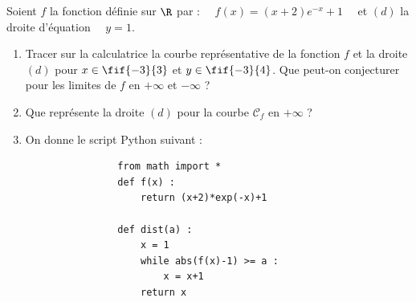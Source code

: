 \documentclass[a4paper,11pt,exos]{nsi} %
\begin{document}
Soient $f$ la fonction définie sur $\R$ par : $\quad f(x)=(x+2)e^{-x}+1\quad$ et $(d)$ la droite d'équation $\quad y=1$.
\begin{enumerate}
	\item \faCalculator\hspace*{.3cm}Tracer sur la calculatrice la courbe représentative de la fonction $f$ et la droite $(d)$ pour $x\in\fif{-3}{3}$ et $y\in\fif{-3}{4}$.
	Que peut-on conjecturer pour les limites de $f$ en $+\infty$ et $-\infty$ ?
	\item Que représente la droite $(d)$ pour la courbe $\mathcal{C}_f$ en $+\infty$ ?
	\item \faPython\hspace*{.3cm}On donne le script Python suivant :\\
	\begin{minipage}{9cm}
	\end{minipage}
	\hspace*{.5cm}
	\begin{minipage}{8cm}
		\begin{pyc}
			\begin{verbatim}
				from math import *
				def f(x) :
					return (x+2)*exp(-x)+1
				
				def dist(a) :
					x = 1
					while abs(f(x)-1) >= a :
						x = x+1
					return x
			\end{verbatim}
		\end{pyc}
	\end{minipage}	
\end{enumerate}
\end{document}
